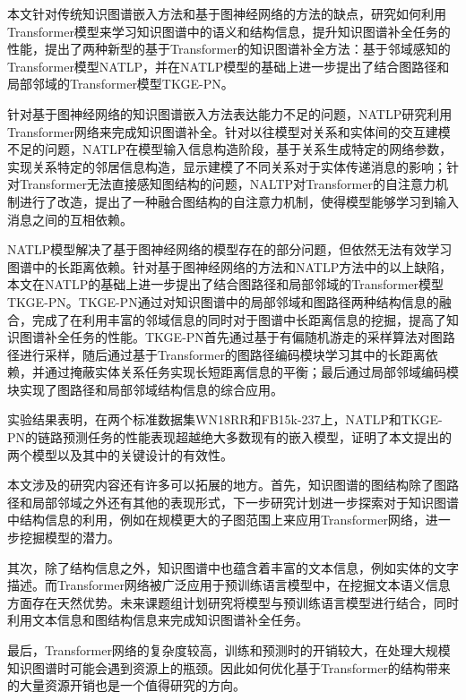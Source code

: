 \summary
本文针对传统知识图谱嵌入方法和基于图神经网络的方法的缺点，研究如何利用Transformer模型来学习知识图谱中的语义和结构信息，提升知识图谱补全任务的性能，提出了两种新型的基于Transformer的知识图谱补全方法：基于邻域感知的Transformer模型NATLP，并在NATLP模型的基础上进一步提出了结合图路径和局部邻域的Transformer模型TKGE-PN。

针对基于图神经网络的知识图谱嵌入方法表达能力不足的问题，NATLP研究利用Transformer网络来完成知识图谱补全。针对以往模型对关系和实体间的交互建模不足的问题，NATLP在模型输入信息构造阶段，基于关系生成特定的网络参数，实现关系特定的邻居信息构造，显示建模了不同关系对于实体传递消息的影响；针对Transformer无法直接感知图结构的问题，NALTP对Transformer的自注意力机制进行了改造，提出了一种融合图结构的自注意力机制，使得模型能够学习到输入消息之间的互相依赖。

NATLP模型解决了基于图神经网络的模型存在的部分问题，但依然无法有效学习图谱中的长距离依赖。针对基于图神经网络的方法和NATLP方法中的以上缺陷，本文在NATLP的基础上进一步提出了结合图路径和局部邻域的Transformer模型TKGE-PN。TKGE-PN通过对知识图谱中的局部邻域和图路径两种结构信息的融合，完成了在利用丰富的邻域信息的同时对于图谱中长距离信息的挖掘，提高了知识图谱补全任务的性能。TKGE-PN首先通过基于有偏随机游走的采样算法对图路径进行采样，随后通过基于Transformer的图路径编码模块学习其中的长距离依赖，并通过掩蔽实体关系任务实现长短距离信息的平衡；最后通过局部邻域编码模块实现了图路径和局部邻域结构信息的综合应用。

实验结果表明，在两个标准数据集WN18RR和FB15k-237上，NATLP和TKGE-PN的链路预测任务的性能表现超越绝大多数现有的嵌入模型，证明了本文提出的两个模型以及其中的关键设计的有效性。


本文涉及的研究内容还有许多可以拓展的地方。首先，知识图谱的图结构除了图路径和局部邻域之外还有其他的表现形式，下一步研究计划进一步探索对于知识图谱中结构信息的利用，例如在规模更大的子图范围上来应用Transformer网络，进一步挖掘模型的潜力。

其次，除了结构信息之外，知识图谱中也蕴含着丰富的文本信息，例如实体的文字描述。而Transformer网络被广泛应用于预训练语言模型中，在挖掘文本语义信息方面存在天然优势。未来课题组计划研究将模型与预训练语言模型进行结合，同时利用文本信息和图结构信息来完成知识图谱补全任务。

最后，Transformer网络的复杂度较高，训练和预测时的开销较大，在处理大规模知识图谱时可能会遇到资源上的瓶颈。因此如何优化基于Transformer的结构带来的大量资源开销也是一个值得研究的方向。

